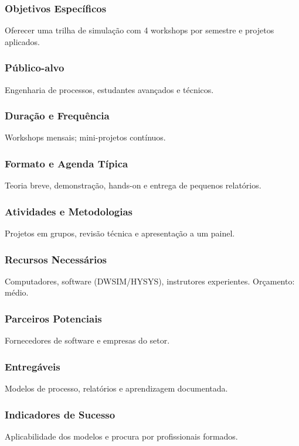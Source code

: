 \documentclass[12pt,a4paper]{article}
\begin{document}
\subsubsection*{Objetivos Específicos}
Oferecer uma trilha de simulação com 4 workshops por semestre e projetos aplicados.

\subsubsection*{Público-alvo}
Engenharia de processos, estudantes avançados e técnicos.

\subsubsection*{Duração e Frequência}
Workshops mensais; mini-projetos contínuos.

\subsubsection*{Formato e Agenda Típica}
Teoria breve, demonstração, hands-on e entrega de pequenos relatórios.

\subsubsection*{Atividades e Metodologias}
Projetos em grupos, revisão técnica e apresentação a um painel.

\subsubsection*{Recursos Necessários}
Computadores, software (DWSIM/HYSYS), instrutores experientes. Orçamento: médio.

\subsubsection*{Parceiros Potenciais}
Fornecedores de software e empresas do setor.

\subsubsection*{Entregáveis}
Modelos de processo, relatórios e aprendizagem documentada.

\subsubsection*{Indicadores de Sucesso}
Aplicabilidade dos modelos e procura por profissionais formados.
\end{document}
